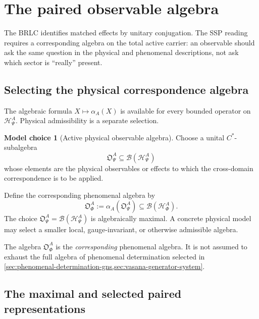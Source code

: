 \documentclass[11pt,reqno]{scrartcl}
\newcommand{\actHP}{\mathscr H_{\Psi}^{A}}
\newcommand{\actHF}{\mathscr H_{\Phi}^{A}}
\newcommand{\alphaA}{\alpha_{A}}
\newcommand{\obsP}{\mathfrak O_{\Psi}^{A}}
\newcommand{\obsF}{\mathfrak O_{\Phi}^{A}}
\theoremstyle{plain}
\theoremstyle{definition}
\newtheorem{modelchoice}[modelchoice]{Model choice}
\theoremstyle{remark}
\begin{document}
\section{The paired observable algebra}
\label{sec:paired-observable-algebra}

The BRLC identifies matched effects by unitary conjugation.  The SSP reading
requires a corresponding algebra on the total active carrier: an observable
should ask the same question in the physical and phenomenal descriptions,
not ask which sector is ``really'' present.

\subsection{Selecting the physical correspondence algebra}

The algebraic formula \(X\mapsto\alphaA(X)\) is available for every bounded
operator on \(\actHP\).  Physical admissibility is a separate selection.

\begin{modelchoice}[Active physical observable algebra]
\label{choice:active-physical-observable-algebra}
Choose a unital \(C^*\)-subalgebra
\begin{equation}
  \boxed{
  \obsP\subseteq\mathcal B(\actHP)}
  \label{eq:active-physical-observable-algebra}
\end{equation}
whose elements are the physical observables or effects to which the
cross-domain correspondence is to be applied.
\end{modelchoice}

Define the corresponding phenomenal algebra by
\begin{equation}
  \boxed{
  \obsF:=\alphaA(\obsP)
  \subseteq\mathcal B(\actHF).}
  \label{eq:corresponding-phenomenal-algebra}
\end{equation}
The choice \(\obsP=\mathcal B(\actHP)\) is algebraically maximal.  A concrete
physical model may select a smaller local, gauge-invariant, or otherwise
admissible algebra.

The algebra \(\obsF\) is the \emph{corresponding} phenomenal algebra.  It is
not assumed to exhaust the full algebra of phenomenal determination selected
in \cref{sec:phenomenal-determination-gns,sec:vasana-generator-system}.

\subsection{The maximal and selected paired representations}
\end{document}
